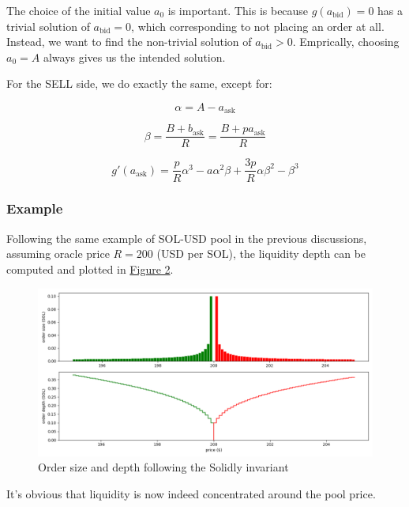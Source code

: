 \documentclass{article}
\begin{document}
The choice of the initial value $a_0$ is important. This is because $g(a_{\mathrm{bid}}) = 0$ has a trivial solution of $a_{\mathrm{bid}} = 0$, which corresponding to not placing an order at all. Instead, we want to find the non-trivial solution of $a_{\mathrm{bid}} > 0$. Emprically, choosing $a_0 = A$ always gives us the intended solution.

For the SELL side, we do exactly the same, except for:

\begin{equation}
  \alpha = A - a_{\mathrm{ask}}
\end{equation}

\begin{equation}
  \beta = \frac{B + b_{\mathrm{ask}}}{R} = \frac{B + p a_{\mathrm{ask}}}{R}
\end{equation}

\begin{equation}
  g'(a_{\mathrm{ask}}) = \frac{p}{R} \alpha^3 - a \alpha^2 \beta + \frac{3p}{R} \alpha \beta^2 - \beta^3
\end{equation}

\subsubsection{Example}

Following the same example of SOL-USD pool in the previous discussions, assuming oracle price $R = 200$ (USD per SOL), the liquidity depth can be computed and plotted in \hyperref[fig:2]{Figure 2}.

\begin{figure}
  \includegraphics[width=\textwidth]{2-solidly.png}
  \caption{Order size and depth following the Solidly invariant}
  \label{fig:2}
\end{figure}

It's obvious that liquidity is now indeed concentrated around the pool price.
\end{document}

